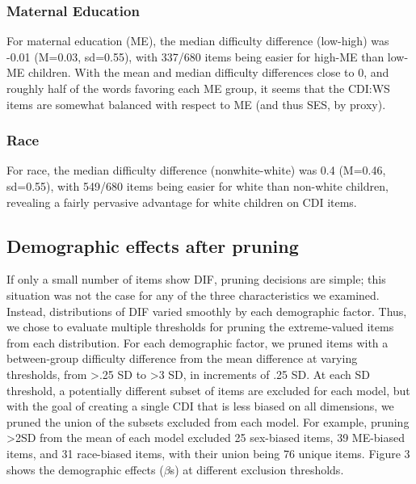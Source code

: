 \documentclass[10pt, letterpaper]{article}
\begin{document}
\hypertarget{maternal-education}{%
\subsubsection{Maternal Education}\label{maternal-education}}

For maternal education (ME), the median difficulty difference (low-high)
was -0.01 (M=0.03, sd=0.55), with 337/680 items being easier for high-ME
than low-ME children. With the mean and median difficulty differences
close to 0, and roughly half of the words favoring each ME group, it
seems that the CDI:WS items are somewhat balanced with respect to ME
(and thus SES, by proxy).

\hypertarget{race}{%
\subsubsection{Race}\label{race}}

For race, the median difficulty difference (nonwhite-white) was 0.4
(M=0.46, sd=0.55), with 549/680 items being easier for white than
non-white children, revealing a fairly pervasive advantage for white
children on CDI items.

\hypertarget{demographic-effects-after-pruning}{%
\subsection{Demographic effects after
pruning}\label{demographic-effects-after-pruning}}

If only a small number of items show DIF, pruning decisions are simple;
this situation was not the case for any of the three characteristics we
examined. Instead, distributions of DIF varied smoothly by each
demographic factor. Thus, we chose to evaluate multiple thresholds for
pruning the extreme-valued items from each distribution. For each
demographic factor, we pruned items with a between-group difficulty
difference from the mean difference at varying thresholds, from
\textgreater.25 SD to \textgreater3 SD, in increments of .25 SD. At each
SD threshold, a potentially different subset of items are excluded for
each model, but with the goal of creating a single CDI that is less
biased on all dimensions, we pruned the union of the subsets excluded
from each model. For example, pruning \textgreater2SD from the mean of
each model excluded 25 sex-biased items, 39 ME-biased items, and 31
race-biased items, with their union being 76 unique items. Figure 3
shows the demographic effects (\(\beta\)s) at different exclusion
thresholds.
\end{document}

